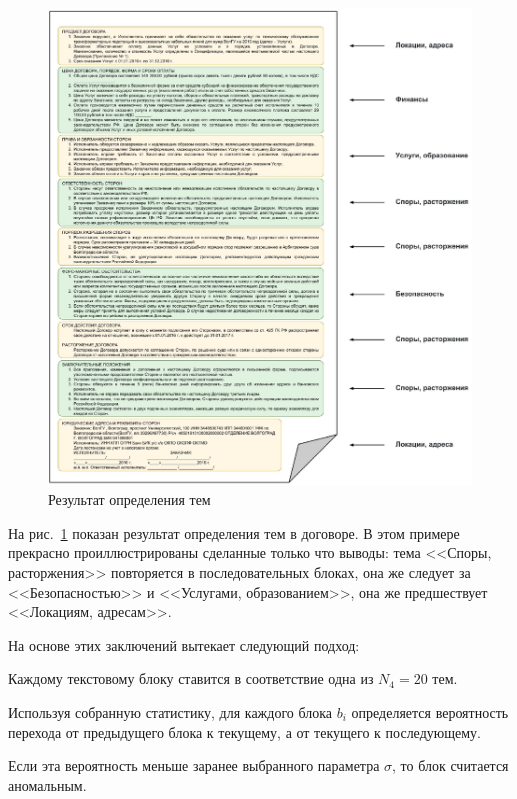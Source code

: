 \documentclass[14pt]{matmex-diploma-custom}
\begin{document}
\begin{center}
	\begin{figure}[h!]
		\centering
		\includegraphics[scale=0.82]{images/im6.eps}
		\caption{Результат определения тем}
		\label{im6}
	\end{figure}
\end{center}

На рис.~\ref{im6} показан результат определения тем в договоре. В этом примере прекрасно проиллюстрированы сделанные только что выводы: тема <<Споры, расторжения>> повторяется в последовательных блоках, она же следует за <<Безопасностью>> и <<Услугами, образованием>>, она же предшествует <<Локациям, адресам>>. 

На основе этих заключений вытекает следующий подход:

\par\begin{enumerate}{
		\vspace{-0.2cm}\item Каждому текстовому блоку ставится в соответствие одна из $N_4 = 20$ тем.
		\vspace{-0.2cm}\item Используя собранную статистику, для каждого блока $b_i$ определяется вероятность перехода от предыдущего блока к текущему, а от текущего к последующему.  
		\vspace{-0.2cm}\item Если эта вероятность меньше заранее выбранного параметра $\sigma$, то блок считается аномальным.
}\end{enumerate}
\end{document}
